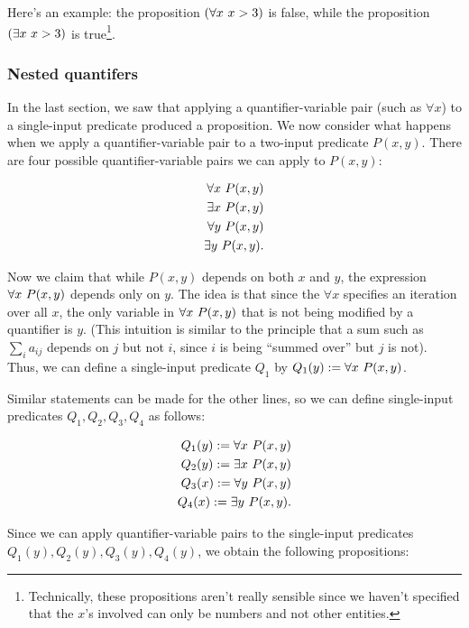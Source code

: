 Here's an example: the proposition $(\forall x \text{ } x > 3)$ is false, while the proposition $(\exists x \text{ } x > 3)$ is true\footnote{Technically, these propositions aren't really sensible since we haven't specified that the $x$'s involved can only be numbers and not other entities.}.

\subsubsection{Nested quantifers}

In the last section, we saw that applying a quantifier-variable pair (such as $\forall x$) to a single-input predicate produced a proposition. We now consider what happens when we apply a quantifier-variable pair to a two-input predicate $P(x, y)$. There are four possible quantifier-variable pairs we can apply to $P(x, y)$:

\begin{align*}
    \forall x \text{ } P(x, y) \\
    \exists x \text{ } P(x, y) \\
    \forall y \text{ } P(x, y) \\
    \exists y \text{ } P(x, y).
\end{align*}

Now we claim that while $P(x, y)$ depends on both $x$ and $y$, the expression $\forall x \text{ } P(x, y)$ depends only on $y$. The idea is that since the $\forall x$ specifies an iteration over all $x$, the only variable in $\forall x \text{ } P(x, y)$ that is not being modified by a quantifier is $y$. (This intuition is similar to the principle that a sum such as $\sum_i a_{ij}$ depends on $j$ but not $i$, since $i$ is being ``summed over'' but $j$ is not). Thus, we can define a single-input predicate $Q_1$ by $Q_1(y) := \forall x \text{ } P(x, y)$.

Similar statements can be made for the other lines, so we can define single-input predicates $Q_1, Q_2, Q_3, Q_4$ as follows:

\begin{align*}
    Q_1(y) := \forall x \text{ } P(x, y) \\
    Q_2(y) := \exists x \text{ } P(x, y) \\
    Q_3(x) := \forall y \text{ } P(x, y) \\
    Q_4(x) := \exists y \text{ } P(x, y).
\end{align*}

Since we can apply quantifier-variable pairs to the single-input predicates $Q_1(y), Q_2(y), Q_3(y), Q_4(y)$, we obtain the following propositions:

